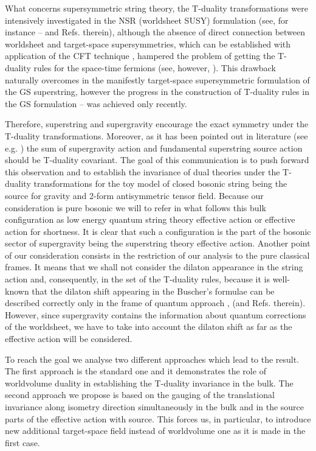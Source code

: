 \documentclass[a4paper,11pt]{article}
\begin{document}
What concerns supersymmetric string theory, the T-duality
transformations were intensively investigated in the NSR
(worldsheet SUSY) formulation (see, for instance
\cite{agb}--\cite{abb} and Refs. therein), although
the absence of direct connection between worldsheet and
target-space supersymmetries, which can be established with
application of the CFT technique \cite{bd}, hampered the problem of
getting the T-duality rules for the space-time fermions (see, however, 
\cite{hassan1}). This
drawback naturally overcomes in the manifestly target-space
supersymmetric formulation of the GS superstring, however the
progress in the construction of T-duality rules in the GS
formulation
\cite{clps}--\cite{kr} was achieved only recently.

Therefore, superstring and supergravity encourage the
exact symmetry under the T-duality transformations. Moreover, as it has been
pointed out in literature (see e.g. \cite{t}) the sum of supergravity action 
and fundamental
superstring source action should be T-duality covariant. The goal
of this communication is to push forward this observation and
to establish the invariance of dual
theories under the T-duality transformations for the toy model of
closed bosonic string being the source for gravity and 2-form
antisymmetric tensor field. Because our consideration is pure
bosonic we will to refer in what follows this bulk configuration
as low energy quantum string theory effective action \cite{ft0} or effective
action for shortness. It is clear that such a configuration
is the part of the bosonic sector of supergravity being the superstring theory 
effective action. Another point of our consideration consists in the  
restriction of our analysis
to the pure classical frames. It means that we shall not
consider the dilaton appearance in the string action and, consequently,
in the set of the T-duality rules, because it is 
well-known that the dilaton shift appearing in the Buscher's formulae can be
described correctly only in the frame of quantum approach
\cite{abl}, \cite{jrst} (and Refs. therein). However, since supergravity
contains the information about quantum corrections of the worldsheet, we have 
to take into account the dilaton shift as far as the effective action will be
considered.

To reach the goal we analyse two different approaches which lead to the result.
The first approach is the standard one and it demonstrates the role of 
worldvolume duality in establishing the T-duality invariance in the bulk. 
The second approach we propose is based on the gauging of the translational 
invariance along isometry direction simultaneously in the bulk and in the 
source parts of the effective action with source. This forces us, in 
particular, to introduce new additional target-space field instead of 
worldvolume one as it is made in the first case.
\end{document}
